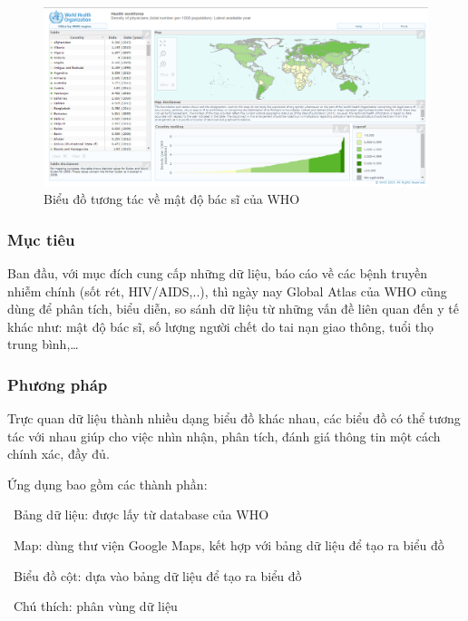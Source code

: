 \documentclass[12pt,a4paper,oneside]{article}
\begin{document}
\begin{center}
    \begin{figure}[htp]
    \begin{center}
     \includegraphics[scale=.4]{image/globalatlas}
    \end{center}
    \caption{Biểu đồ tương tác về mật độ bác sĩ của WHO}
    \label{refhinh2}
    \end{figure}
\end{center}

\subsubsection{Mục tiêu}
Ban đầu, với mục đích cung cấp những dữ liệu, báo cáo về các bệnh truyền nhiễm chính (sốt rét, HIV/AIDS,..), thì ngày nay Global Atlas của WHO cũng dùng để phân tích, biểu diễn, so sánh dữ liệu từ những vấn đề liên quan đến y tế khác như: mật độ bác sĩ, số lượng người chết do tai nạn giao thông, tuổi thọ trung bình,… 

\subsubsection{Phương pháp}
Trực quan dữ liệu thành nhiều dạng biểu đồ khác nhau, các biểu đồ có thể tương tác với nhau giúp cho việc nhìn nhận, phân tích, đánh giá thông tin một cách chính xác, đầy đủ.

Ứng dụng\cite{ghaex} bao gồm các thành phần:

\indent \indent \textbullet \ Bảng dữ liệu: được lấy từ database của WHO

\indent \indent \textbullet \ Map: dùng thư viện Google Maps, kết hợp với bảng dữ liệu để tạo ra biểu đồ

\indent \indent \textbullet \ Biểu đồ cột: dựa vào bảng dữ liệu để tạo ra biểu đồ

\indent \indent \textbullet \ Chú thích: phân vùng dữ liệu
\end{document}
